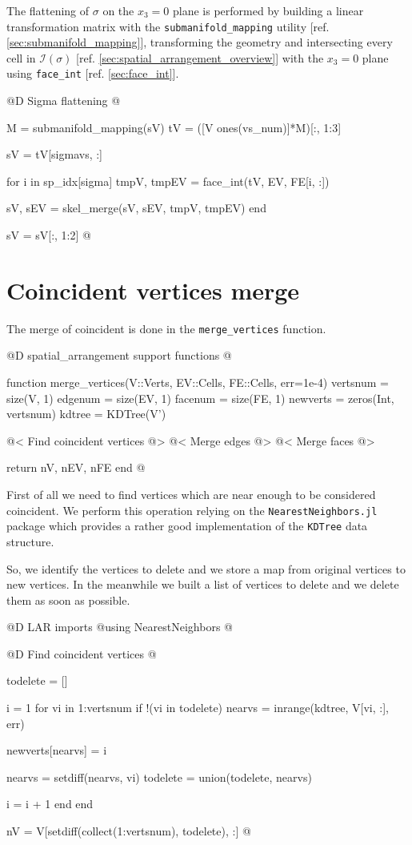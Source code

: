 The flattening of $\sigma$ on the $x_3=0$ plane
is performed by building a linear transformation matrix with the
\texttt{submanifold\_mapping} utility [ref. \ref{sec:submanifold_mapping}],
transforming the geometry and intersecting every cell in $\mathcal{I}(\sigma)$
[ref. \ref{sec:spatial_arrangement_overview}]
with the $x_3=0$ plane using \texttt{face\_int} [ref. \ref{sec:face_int}].

@D Sigma flattening
@{M = submanifold_mapping(sV)
tV = ([V ones(vs_num)]*M)[:, 1:3]

sV = tV[sigmavs, :]

for i in sp_idx[sigma]
    tmpV, tmpEV = face_int(tV, EV, FE[i, :])
    
    sV, sEV = skel_merge(sV, sEV, tmpV, tmpEV)
end

sV = sV[:, 1:2]
@}




\section{Coincident vertices merge}
\label{sec:3D_merge_vertices}

The merge of coincident is done in the \texttt{merge\_vertices}
function.

@D spatial\_arrangement support functions
@{function merge_vertices(V::Verts, EV::Cells, FE::Cells, err=1e-4)
    vertsnum = size(V, 1)
    edgenum = size(EV, 1)
    facenum = size(FE, 1)
    newverts = zeros(Int, vertsnum)
    kdtree = KDTree(V')

    @< Find coincident vertices @>
    @< Merge edges @>
    @< Merge faces @>

    return nV, nEV, nFE
end
@}

First of all we need to find vertices which are near enough
to be considered coincident. We perform this operation
relying on the \texttt{NearestNeighbors.jl} package\cite{NearestNeighbors}
which provides a rather good implementation of the \texttt{KDTree} data structure.

So, we identify the vertices to delete and we store a map
from original vertices to new vertices. In the meanwhile
we built a list of vertices to delete and we delete them 
as soon as possible.

@D LAR imports
@{using NearestNeighbors
@}

@D Find coincident vertices
@{todelete = []

i = 1
for vi in 1:vertsnum
    if !(vi in todelete)
        nearvs = inrange(kdtree, V[vi, :], err)

        newverts[nearvs] = i

        nearvs = setdiff(nearvs, vi)
        todelete = union(todelete, nearvs)

        i = i + 1
    end
end

nV = V[setdiff(collect(1:vertsnum), todelete), :]
@}

